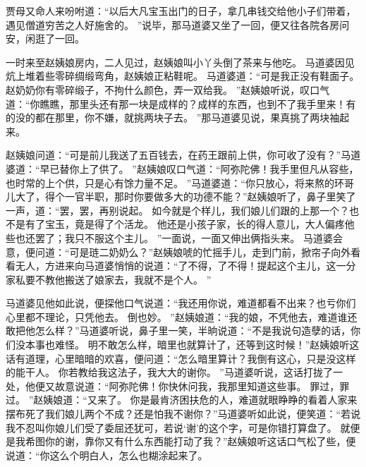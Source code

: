 贾母又命人来吩咐道：“以后大凡宝玉出门的日子，拿几串钱交给他小子们带着，遇见僧道穷苦之人好施舍的。
”说毕，那马道婆又坐了一回，便又往各院各房问安，闲逛了一回。
\par
一时来至赵姨娘房内，二人见过，赵姨娘叫小丫头倒了茶来与他吃。
马道婆因见炕上堆着些零碎绸缎弯角，赵姨娘正粘鞋呢。
马道婆道：“可是我正没有鞋面子。
赵奶奶你有零碎缎子，不拘什么颜色，弄一双给我。
”赵姨娘听说，叹口气道：“你瞧瞧，那里头还有那一块是成样的？成样的东西，也到不了我手里来！有的没的都在那里，你不嫌，就挑两块子去。
”那马道婆见说，果真挑了两块袖起来。
\par
赵姨娘问道：“可是前儿我送了五百钱去，在药王跟前上供，你可收了没有？”马道婆道：“早已替你上了供了。
”赵姨娘叹口气道：“阿弥陀佛！我手里但凡从容些，也时常的上个供，只是心有馀力量不足。
”马道婆道：“你只放心，将来熬的环哥儿大了，得个一官半职，那时你要做多大的功德不能？”赵姨娘听了，鼻子里笑了一声，道：“罢，罢，再别说起。
如今就是个样儿，我们娘儿们跟的上那一个？也不是有了宝玉，竟是得了个活龙。
他还是小孩子家，长的得人意儿，大人偏疼他些也还罢了；我只不服这个主儿。
”一面说，一面又伸出俩指头来。
马道婆会意，便问道：“可是琏二奶奶么？”赵姨娘唬的忙摇手儿，走到门前，掀帘子向外看看无人，方进来向马道婆悄悄的说道：“了不得，了不得！提起这个主儿，这一分家私要不教他搬送了娘家去，我就不是个人。
”\par
马道婆见他如此说，便探他口气说道：“我还用你说，难道都看不出来？也亏你们心里都不理论，只凭他去。
倒也妙。
”赵姨娘道：“我的娘，不凭他去，难道谁还敢把他怎么样？”马道婆听说，鼻子里一笑，半晌说道：“不是我说句造孽的话，你们没本事也难怪。
明不敢怎么样，暗里也就算计了，还等到这时候！”赵姨娘听这话有道理，心里暗暗的欢喜，便问道：“怎么暗里算计？我倒有这心，只是没这样的能干人。
你若教给我这法子，我大大的谢你。
”马道婆听说，这话打拢了一处，他便又故意说道：“阿弥陀佛！你快休问我，我那里知道这些事。
罪过，罪过。
”赵姨娘道：“又来了。
你是最肯济困扶危的人，难道就眼睁睁的看着人家来摆布死了我们娘儿两个不成？还是怕我不谢你？”马道婆听如此说，便笑道：“若说我不忍叫你娘儿们受了委屈还犹可，若说‘谢’的这个字，可是你错打算盘了。
就便是我希图你的谢，靠你又有什么东西能打动了我？”赵姨娘听这话口气松了些，便说道：“你这么个明白人，怎么也糊涂起来了。
